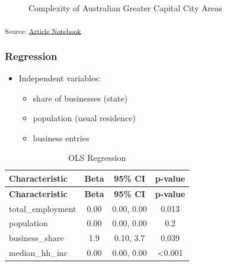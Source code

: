 \documentclass[
  number]{elsarticle}
\begin{document}
\label{cell-fig-gcc-complexity}
\begin{figure}[H]


\caption{\label{fig-gcc-complexity}Complexity of Australian Greater
Capital City Areas}

\end{figure}%

\textsubscript{Source:
\href{https://aiti-flinders.github.io/sirp-complexity/index.qmd.html}{Article
Notebook}}

\subsubsection{Regression}\label{regression}

\begin{itemize}
\item
  Independent variables:

  \begin{itemize}
  \item
    share of businesses (state)
  \item
    population (usual residence)
  \item
    business entries
  \end{itemize}
\end{itemize}

\begin{longtable}[]{@{}lccc@{}}
\caption{OLS Regression}\tabularnewline
\toprule\noalign{}
\textbf{Characteristic} & \textbf{Beta} & \textbf{95\% CI} &
\textbf{p-value} \\
\midrule\noalign{}
\endfirsthead
\toprule\noalign{}
\textbf{Characteristic} & \textbf{Beta} & \textbf{95\% CI} &
\textbf{p-value} \\
\midrule\noalign{}
\endhead
\bottomrule\noalign{}
\endlastfoot
total\_employment & 0.00 & 0.00, 0.00 & 0.013 \\
population & 0.00 & 0.00, 0.00 & 0.2 \\
business\_share & 1.9 & 0.10, 3.7 & 0.039 \\
median\_hh\_inc & 0.00 & 0.00, 0.00 & \textless0.001 \\
\end{longtable}
\end{document}
